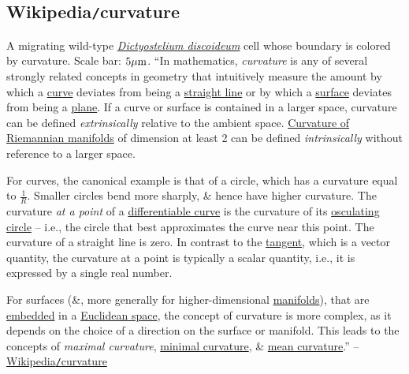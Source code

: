 \documentclass{article}
\begin{document}

\subsection{Wikipedia{\tt/}curvature}
{\sf A migrating wild-type \href{https://en.wikipedia.org/wiki/Dictyostelium_discoideum}{\it Dictyostelium discoideum} cell whose boundary is colored by curvature. Scale bar: $5\mu{\rm m}$.} ``In mathematics, {\it curvature} is any of several strongly related concepts in geometry that intuitively measure the amount by which a \href{https://en.wikipedia.org/wiki/Curve}{curve} deviates from being a \href{https://en.wikipedia.org/wiki/Straight_line}{straight line} or by which a \href{https://en.wikipedia.org/wiki/Surface_(mathematics)}{surface} deviates from being a \href{https://en.wikipedia.org/wiki/Plane_(geometry)}{plane}. If a curve or surface is contained in a larger space, curvature can be defined {\it extrinsically} relative to the ambient space. \href{https://en.wikipedia.org/wiki/Curvature_of_Riemannian_manifolds}{Curvature of Riemannian manifolds} of dimension at least 2 can be defined {\it intrinsically} without reference to a larger space.

For curves, the canonical example is that of a circle, which has a curvature equal to $\frac{1}{R}$. Smaller circles bend more sharply, \& hence have higher curvature. The curvature {\it at a point} of a \href{https://en.wikipedia.org/wiki/Differentiable_curve}{differentiable curve} is the curvature of its \href{https://en.wikipedia.org/wiki/Osculating_circle}{osculating circle} -- i.e., the circle that best approximates the curve near this point. The curvature of a straight line is zero. In contrast to the \href{https://en.wikipedia.org/wiki/Tangent}{tangent}, which is a vector quantity, the curvature at a point is typically a scalar quantity, i.e., it is expressed by a single real number.

For surfaces (\&, more generally for higher-dimensional \href{https://en.wikipedia.org/wiki/Manifold}{manifolds}), that are \href{https://en.wikipedia.org/wiki/Embedding}{embedded} in a \href{https://en.wikipedia.org/wiki/Euclidean_space}{Euclidean space}, the concept of curvature is more complex, as it depends on the choice of a direction on the surface or manifold. This leads to the concepts of {\it maximal curvature}, \href{https://en.wikipedia.org/wiki/Minimal_surface}{minimal curvature}, \& \href{https://en.wikipedia.org/wiki/Mean_curvature}{mean curvature}.'' -- \href{https://en.wikipedia.org/wiki/Curvature}{Wikipedia{\tt/}curvature}
\end{document}
